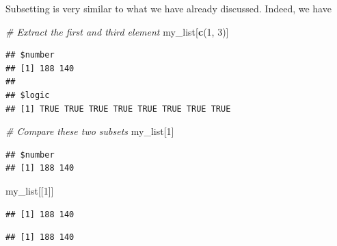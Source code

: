 \documentclass[12pt,]{krantz}
\newenvironment{Shaded}{\begin{snugshade}}{\end{snugshade}}
\newcommand{\KeywordTok}[1]{\textcolor[rgb]{0.27,0.27,0.27}{\textbf{#1}}}
\newcommand{\DecValTok}[1]{\textcolor[rgb]{0.06,0.06,0.06}{#1}}
\newcommand{\CommentTok}[1]{\textcolor[rgb]{0.37,0.37,0.37}{\textit{#1}}}
\newcommand{\OperatorTok}[1]{\textcolor[rgb]{0.43,0.43,0.43}{\textbf{#1}}}
\newcommand{\NormalTok}[1]{#1}
\begin{document}
Subsetting is very similar to what we have already discussed. Indeed, we
have

\begin{Shaded}
\begin{Highlighting}[]
\CommentTok{# Extract the first and third element }
\NormalTok{my_list[}\KeywordTok{c}\NormalTok{(}\DecValTok{1}\NormalTok{, }\DecValTok{3}\NormalTok{)]}
\end{Highlighting}
\end{Shaded}

\begin{verbatim}
## $number
## [1] 188 140
## 
## $logic
## [1] TRUE TRUE TRUE TRUE TRUE TRUE TRUE TRUE
\end{verbatim}

\begin{Shaded}
\begin{Highlighting}[]
\CommentTok{# Compare these two subsets  }
\NormalTok{my_list[}\DecValTok{1}\NormalTok{]}
\end{Highlighting}
\end{Shaded}

\begin{verbatim}
## $number
## [1] 188 140
\end{verbatim}

\begin{Shaded}
\begin{Highlighting}[]
\NormalTok{my_list[[}\DecValTok{1}\NormalTok{]]}
\end{Highlighting}
\end{Shaded}

\begin{verbatim}
## [1] 188 140
\end{verbatim}

\begin{Shaded}
\end{Shaded}

\begin{verbatim}
## [1] 188 140
\end{verbatim}

\begin{Shaded}
\end{Shaded}
\end{document}
